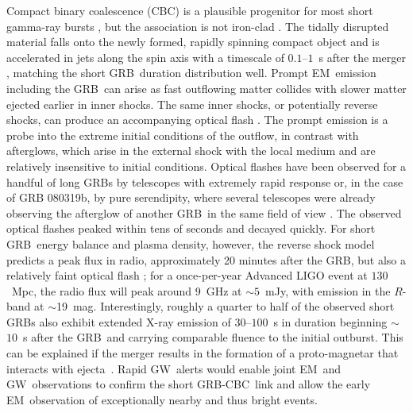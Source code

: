 \documentclass[preprint2]{aastex}
\newcommand{\GW}{GW}%
\newcommand{\EM}{EM}%
\newcommand{\GRB}{GRB}%
\newcommand{\CBC}{CBC}%
\begin{document}
Compact binary coalescence (\CBC) is a plausible progenitor for most short
gamma-ray bursts \citep[short \GRB{}s;][]{Lee:2005, nakar07}, but the
association is not iron-clad \citep{2011ApJ...727..109V}. The tidally
disrupted material falls onto the newly formed, rapidly spinning compact object
and is accelerated in jets along the spin axis with a timescale of $0.1$--$1$~s
after the merger \citep{Janka1999}, matching the short \GRB\ duration
distribution well. Prompt \EM\ emission including the \GRB\ can arise as fast
outflowing matter collides with slower matter ejected earlier in inner shocks.
The same inner shocks, or potentially reverse shocks, can produce an
accompanying optical flash \citep{Sari99}. The prompt emission is a probe into
the extreme initial conditions of the outflow, in contrast with afterglows,
which arise in the external shock with the local medium and are relatively
insensitive to initial conditions. Optical flashes have been observed for a
handful of long \GRB{}s \citep{2011CRPhy..12..255A} by telescopes with extremely
rapid response or, in the case of GRB 080319b, by pure serendipity, where
several telescopes were already observing the afterglow of another \GRB\ in
the same field of view \citep[FOV;][]{2008Natur.455..183R}. The observed optical flashes
peaked within tens of seconds and decayed quickly. For short \GRB\ energy
balance and plasma density, however, the reverse shock model predicts a peak
flux in radio, approximately 20 minutes after the \GRB, but also a relatively
faint optical flash \citep{nakar07}; for a once-per-year Advanced LIGO event at
$130$~Mpc, the radio flux will peak around 9~GHz at $\sim$$5$~mJy, with emission
in the $R$-band at $\sim$19~mag. Interestingly, roughly a quarter to half of the 
observed short \GRB{}s also exhibit extended X-ray emission of $30$--$100$~s in
duration beginning $\sim$$10$~s after the \GRB\ and carrying comparable fluence
to the initial outburst. This can be explained if the merger results in the
formation of a proto-magnetar that interacts with
ejecta~\citep{Bucciantini2011}. Rapid \GW\ alerts would enable joint \EM\ and
\GW\ observations to confirm the short \GRB-\CBC\ link and allow the early
\EM\ observation of exceptionally nearby and thus bright events.
\end{document}
